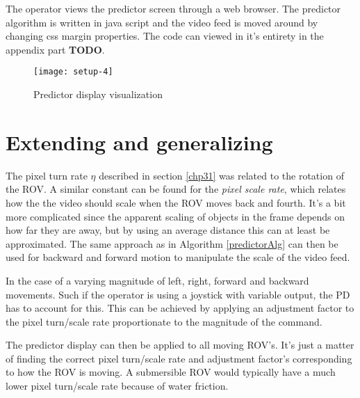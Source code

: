 The operator views the predictor screen through a web browser. The predictor algorithm is written in java script and the video feed is moved around by changing css margin properties. The code can viewed in it's entirety in the appendix part \textbf{TODO}.

\begin{figure}[h!]
    \centering
    \texttt{[image: setup-4]}
    \caption{Predictor display visualization}
    \label{predictorvis}
\end{figure}

\section{Extending and generalizing}\label{expand}

The pixel turn rate $\eta$ described in section \ref{chp31} was related to the rotation of the ROV. A similar constant can be found for the \emph{pixel scale rate}, which relates how the the video should scale when the ROV moves back and fourth. It's a bit more complicated since the apparent scaling of objects in the frame depends on how far they are away, but by using an average distance this can at least be approximated. The same approach as in Algorithm \ref{predictorAlg} can then be used for backward and forward motion to manipulate the scale of the video feed.

In the case of a varying magnitude of left, right, forward and backward movements. Such if the operator is using a joystick with variable output, the PD has to account for this. This can be achieved by applying an adjustment factor to the pixel turn/scale rate proportionate to the magnitude of the command.

The predictor display can then be applied to all moving ROV's. It's just a matter of finding the correct pixel turn/scale rate and adjustment factor's corresponding to how the ROV is moving. A submersible ROV would typically have a much lower pixel turn/scale rate because of water friction.
